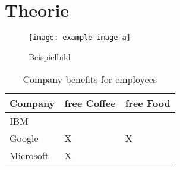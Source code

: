 \chapter{Theorie}

\blindtext{}
\begin{figure}[htb]
    \centering
    \texttt{[image: example-image-a]}
    \caption[Beispielbild]{Beispielbild\label{example}}
\end{figure}

\begin{table}[htb]
    \centering
    \begin{tabular}{@{}lll@{}}
        \toprule
        \textbf{Company}                & \textbf{free Coffee}   & \textbf{free Food}     \\ \midrule
        \multicolumn{1}{|l|}{IBM}       & \multicolumn{1}{l|}{}  & \multicolumn{1}{l|}{}  \\ \midrule
        \multicolumn{1}{|l|}{Google}    & \multicolumn{1}{l|}{X} & \multicolumn{1}{l|}{X} \\ \midrule
        \multicolumn{1}{|l|}{Microsoft} & \multicolumn{1}{l|}{X} & \multicolumn{1}{l|}{}  \\ \bottomrule
    \end{tabular}
    \caption[Company benefits for employees]{\label{tab:NLP_germany}Company benefits for employees }
\end{table}

\blinddocument{}
